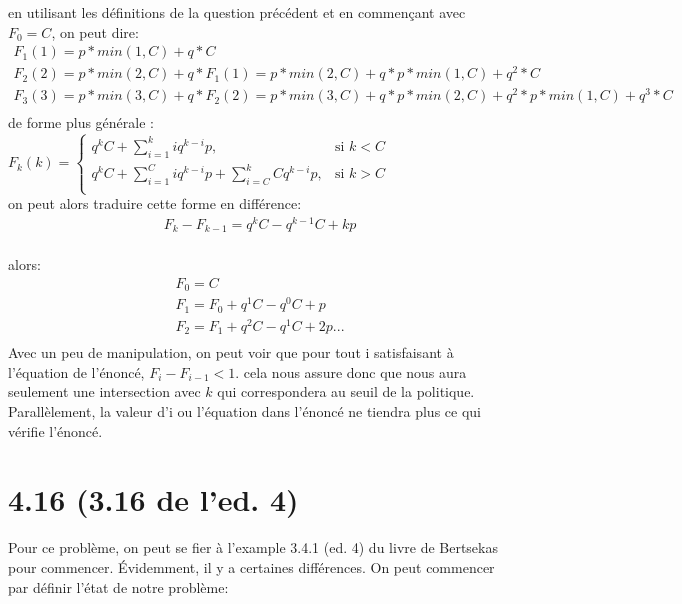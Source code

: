 \documentclass[oneside]{book}
\begin{document}
en utilisant les définitions de la question précédent et en commençant avec $F_0 = C$, on peut dire:\\

\begin{align*}
F_1(1) = p*min(1, C) + q*C\\
F_2(2) = p*min(2, C) + q*F_1(1) = p*min(2,C) + q*p*min(1,C) + q^2*C\\
F_3(3) = p*min(3, C) + q*F_2(2) = p*min(3,C) + q*p*min(2,C) + q^2*p*min(1,C) + q^3*C\\
\end{align*}
de forme plus générale :\\


\begin{math}
F_k(k) =  
\begin{cases}
q^kC + \sum\limits_{i=1}^{k}iq^{k-i}p, & \text{si } k < C\\
q^kC + \sum\limits_{i=1}^{C}iq^{k-i}p + \sum\limits_{i=C}^{k}Cq^{k-i}p, & \text{si }k > C\\
\end{cases}
\end{math}\\

on peut alors traduire cette forme en différence:\\

\begin{align*}
F_{k} - F_{k-1} = q^kC - q^{k-1}C + kp 
\end{align*}\\

alors:\\

\begin{align*}
F_0 = C\\
F_1 = F_0 + q^1C - q^0C + p\\
F_2 = F_1 + q^2C - q^1C + 2p...\\
\end{align*}
Avec un peu de manipulation, on peut voir que pour tout i satisfaisant à l'équation de l'énoncé, $F_i - F_{i-1} < 1$. cela nous assure donc que nous aura seulement une intersection avec $k$ qui correspondera au seuil de la politique. Parallèlement, la valeur d'i ou l'équation dans l'énoncé ne tiendra plus ce qui vérifie l'énoncé.

\section*{4.16 (3.16 de l'ed. 4)}
Pour ce problème, on peut se fier à l'example 3.4.1 (ed. 4) du livre de Bertsekas pour commencer. Évidemment, il y a certaines différences. On peut commencer par définir l'état de notre problème:\\
\end{document}
